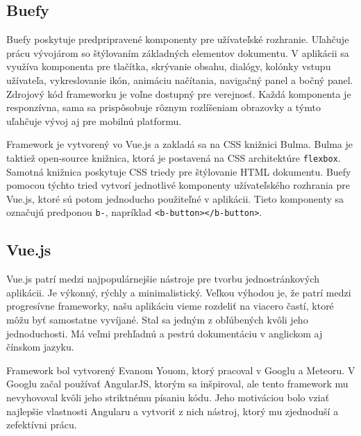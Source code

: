 \subsection*{Buefy}
Buefy poskytuje predpripravené komponenty pre užívateľské rozhranie. Uľahčuje prácu vývojárom so štýlovaním základných elementov dokumentu. V aplikácii sa využíva komponenta pre tlačítka, skrývanie obsahu, dialógy, kolónky vstupu užívateľa, vykreslovanie ikón, animáciu načítania, navigačný panel a bočný panel. Zdrojový kód frameworku je voľne dostupný pre verejnosť. Každá komponenta je responzívna, sama sa prispôsobuje rôznym rozlíšeniam obrazovky a týmto uľahčuje vývoj aj pre mobilnú platformu. 

Framework je vytvorený vo Vue.js a zakladá sa na CSS knižnici Bulma. Bulma je taktiež open-source knižnica, ktorá je postavená na CSS architektúre \texttt{flexbox}. Samotná knižnica poskytuje CSS triedy pre štýlovanie HTML dokumentu. Buefy pomocou týchto tried vytvorí jednotlivé komponenty užívateľského rozhrania pre Vue.js, ktoré sú potom jednoducho použiteľné v aplikácii. Tieto komponenty sa označujú predponou \texttt{b-}, napríklad \texttt{<b-button></b-button>}.

\subsection{Vue.js}
Vue.js\cite{vue-guide} patrí medzi najpopulárnejšie nástroje pre tvorbu jednostránkových aplikácii. Je výkonný, rýchly a minimalistický. Veľkou výhodou je, že patrí medzi progresívne frameworky, našu aplikáciu vieme rozdeliť na viacero častí, ktoré môžu byť samostatne vyvíjané. Stal sa jedným z obľúbených kvôli jeho jednoduchosti. Má veľmi prehľadnú a pestrú dokumentáciu v anglickom aj čínskom jazyku.

Framework bol vytvorený Evanom Youom, ktorý pracoval v Googlu a Meteoru. V Googlu začal používať AngularJS, ktorým sa inšpiroval, ale tento framework mu nevyhovoval kvôli jeho striktnému písaniu kódu. Jeho motiváciou bolo vziať najlepšie vlastnosti Angularu a vytvoriť z nich nástroj, ktorý mu zjednoduší a zefektívni prácu.

